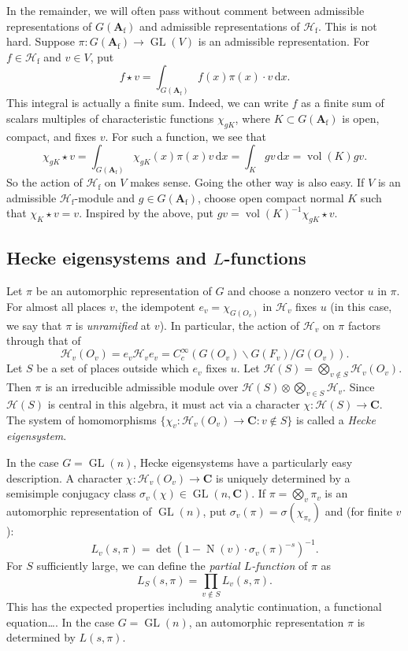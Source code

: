 \documentclass[oneside]{amsart}
\DeclareMathOperator{\GL}{GL}
\DeclareMathOperator{\norm}{N}
\DeclareMathOperator{\volume}{vol}
\newcommand{\dA}{\mathbf{A}}
\newcommand{\dC}{\mathbf{C}}
\newcommand{\dd}{\mathrm{d}}
\newcommand{\finite}{\mathrm{f}}
\newcommand{\hecke}{\mathcal{H}}
\begin{document}
In the remainder, we will often pass without comment between admissible 
representations of $G(\dA_\finite)$ and admissible representations of 
$\hecke_\finite$. This is not hard. Suppose $\pi:G(\dA_\finite)\to \GL(V)$ is 
an admissible representation. For $f\in \hecke_\finite$ and $v\in V$, put 
\[
  f \star v = \int_{G(\dA_\finite)} f(x) \pi(x)\cdot v\, \dd x.
\]
This integral is actually a finite sum. Indeed, we can write $f$ as a finite 
sum of scalars multiples of characteristic functions $\chi_{g K}$, where 
$K\subset G(\dA_\finite)$ is open, compact, and fixes $v$. For such a function, 
we see that 
\[
  \chi_{g K}\star v = \int_{G(\dA_\finite)}\chi_{g K}(x) \pi(x) v\, \dd x = \int_K g v\, \dd x = \volume(K) g  v. 
\]
So the action of $\hecke_\finite$ on $V$ makes sense. Going the other way is 
also easy. If $V$ is an admissible $\hecke_\finite$-module and 
$g\in G(\dA_\finite)$, choose open compact normal $K$ such that 
$\chi_K\star v=v$. Inspired by the above, put 
$g v = \volume(K)^{-1} \chi_{g K}\star v$. 


\subsection{Hecke eigensystems and \texorpdfstring{$L$}{L}-functions}

Let $\pi$ be an automorphic representation of $G$ and choose a nonzero vector 
$u$ in $\pi$. For almost all places $v$, the idempotent $e_v=\chi_{G(O_v)}$ in 
$\hecke_v$ fixes $u$ (in this case, we say that $\pi$ is \emph{unramified} at 
$v$). In particular, the action of $\hecke_v$ on $\pi$ factors 
through that of 
\[
  \hecke_v(O_v) = e_v \hecke_v e_v = C_c^\infty(G(O_v)\backslash G(F_v)/G(O_v)) .
\]
Let $S$ be a set of places outside which $e_v$ fixes $u$. Let 
$\hecke(S)=\bigotimes_{v\notin S} \hecke_v(O_v)$. Then $\pi$ is an irreducible 
admissible module over $\hecke(S)\otimes \bigotimes_{v\in S} \hecke_v$. Since 
$\hecke(S)$ is central in this algebra, it must act via a character 
$\chi:\hecke(S)\to \dC$. The system of homomorphisms 
$\{\chi_v:\hecke_v(O_v) \to \dC:v\notin S\}$ is called a \emph{Hecke 
eigensystem}. 

In the case $G=\GL(n)$, Hecke eigensystems have a particularly easy 
description. A character $\chi:\hecke_v(O_v)\to \dC$ is uniquely determined by 
a semisimple conjugacy class $\sigma_v(\chi)\in \GL(n,\dC)$. If 
$\pi=\bigotimes_v \pi_v$ is an automorphic representation of $\GL(n)$, put 
$\sigma_v(\pi) = \sigma(\chi_{\pi_v})$ and (for finite $v$): 
\[
  L_v(s,\pi) = \det\left(1-\norm(v)\cdot \sigma_v(\pi)^{-s}\right)^{-1} .
\]
For $S$ sufficiently large, we can define the \emph{partial $L$-function} of 
$\pi$ as 
\[
  L_S(s,\pi) = \prod_{v\notin S} L_v(s,\pi) .
\]
This has the expected properties including analytic continuation, a functional 
equation\ldots. In the case $G=\GL(n)$, an automorphic representation $\pi$ is 
determined by $L(s,\pi)$. 
\end{document}
